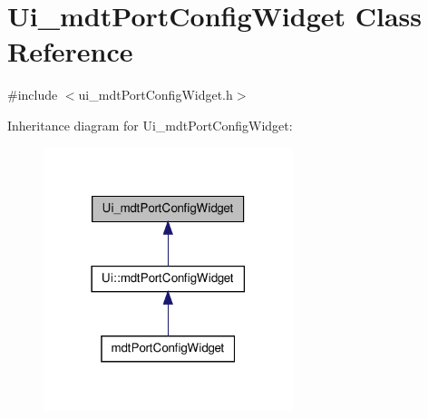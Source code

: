 \hypertarget{class_ui__mdt_port_config_widget}{\section{Ui\-\_\-mdt\-Port\-Config\-Widget Class Reference}
\label{class_ui__mdt_port_config_widget}
}


{\ttfamily \#include $<$ui\-\_\-mdt\-Port\-Config\-Widget.\-h$>$}



Inheritance diagram for Ui\-\_\-mdt\-Port\-Config\-Widget\-:
\nopagebreak
\begin{figure}[H]
\begin{center}
\leavevmode
\includegraphics[width=206pt]{class_ui__mdt_port_config_widget__inherit__graph}
\end{center}
\end{figure}


